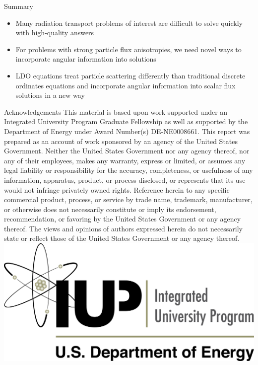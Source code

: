 \documentclass{beamer}
\begin{document}
\begin{frame}{Summary}
%
\begin{itemize}
\item{Many radiation transport problems of interest are difficult to solve quickly with 
      high-quality answers}
\item{For problems with strong particle flux anisotropies, we need novel ways to incorporate
      angular information into solutions}
\item{LDO equations treat particle scattering differently than traditional discrete ordinates
      equations and incorporate angular information into scalar flux solutions in a new way}
\end{itemize}
%
\end{frame}

\begin{frame}{Acknowledgements}
\scriptsize
This material is based upon work supported under an Integrated
University Program Graduate Fellowship as well as supported by the Department 
of Energy under Award Number(s) DE-NE0008661. This report was prepared as an account 
of work sponsored by an agency of the United States Government. Neither the United 
States Government nor any agency thereof, nor any of their employees, makes any 
warranty, express or limited, or assumes any legal liability or responsibility for the 
accuracy, completeness, or usefulness of any information, apparatus, product, or
process disclosed, or represents that its use would not infringe privately owned
rights. Reference herein to any specific commercial product, process, or service by
trade name, trademark, manufacturer, or otherwise does not necessarily constitute or
imply its endorsement, recommendation, or favoring by the United States Government or
any agency thereof. The views and opinions of authors expressed herein do not 
necessarily state or reflect those of the United States Government or any agency 
thereof.
%
\centering
\includegraphics[width=\textwidth,natwidth=2539,natheight=1195]{img/DOE-IUP_Logo.png}
%
\end{frame}
\end{document}
